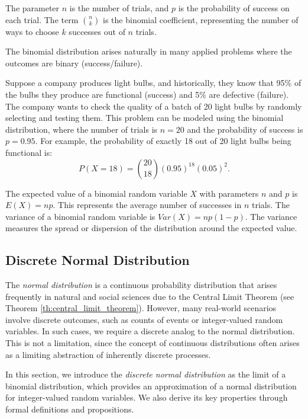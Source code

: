 The parameter $n$ is the number of trials, and $p$ is the probability of success on each trial. The term $\binom{n}{k}$ is the binomial coefficient, representing the number of ways to choose $k$ successes out of $n$ trials.

The binomial distribution arises naturally in many applied problems where the outcomes are binary (success/failure).

\begin{example}
Suppose a company produces light bulbs, and historically, they know that 95\% of the bulbs they produce are functional (success) and 5\% are defective (failure). The company wants to check the quality of a batch of 20 light bulbs by randomly selecting and testing them. This problem can be modeled using the binomial distribution, where the number of trials is $n = 20$ and the probability of success is $p = 0.95$. For example, the probability of exactly 18 out of 20 light bulbs being functional is:
\[
P(X = 18) = \binom{20}{18} (0.95)^{18} (0.05)^2.
\]
\end{example}

The expected value of a binomial random variable $X$ with parameters $n$ and $p$ is $E(X) = np$. This represents the average number of successes in $n$ trials. The variance of a binomial random variable is $Var(X) = np(1 - p)$. The variance measures the spread or dispersion of the distribution around the expected value.

%
%

\subsection{Discrete Normal Distribution}

The \textit{normal distribution} is a continuous probability distribution that arises frequently in natural and social sciences due to the Central Limit Theorem (see Theorem \ref{th:central_limit_theorem}). However, many real-world scenarios involve discrete outcomes, such as counts of events or integer-valued random variables. In such cases, we require a discrete analog to the normal distribution. This is not a limitation, since the concept of continuous distributions often arises as a limiting abstraction of inherently discrete processes.

In this section, we introduce the \textit{discrete normal distribution} as the limit of a binomial distribution, which provides an approximation of a normal distribution for integer-valued random variables. We also derive its key properties through formal definitions and propositions.

